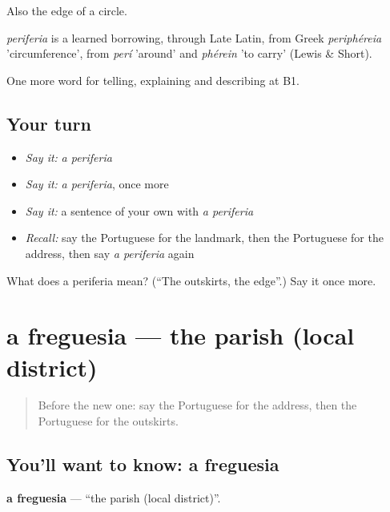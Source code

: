 Also the edge of a circle.

\begin{cousinweb}
\emph{periferia} is a learned borrowing, through Late Latin, from Greek \emph{periphéreia} 'circumference', from \emph{perí} 'around' and \emph{phérein} 'to carry' (Lewis \& Short).
\end{cousinweb}

\begin{grammarlens}[title={What you've built}]
One more word for telling, explaining and describing at B1.
\end{grammarlens}

\subsection*{Your turn}
\begin{itemize}
\raggedright
  \item \emph{Say it:} \emph{a periferia}
  \item \emph{Say it:} \emph{a periferia}, once more
  \item \emph{Say it:} a sentence of your own with \emph{a periferia}
  \item \emph{Recall:} say the Portuguese for the landmark, then the Portuguese for the address, then say \emph{a periferia} again
\end{itemize}

\begin{tcolorbox}[breakable,colback=teal!4,colframe=teal!35!black,title={Before you move on}]
What does a periferia mean? (\textquotedblleft{}The outskirts, the edge\textquotedblright{}.) Say it once more.
\end{tcolorbox}
\section[a freguesia]{a freguesia — the parish (local district)}

\label{lesson:PT-C440-freguesia}



\begin{quote}
Before the new one: say the Portuguese for the address, then the Portuguese for the outskirts.
\end{quote}

\subsection*{You'll want to know: a freguesia}
\textbf{a freguesia} — \textquotedblleft{}the parish (local district)\textquotedblright{}.


